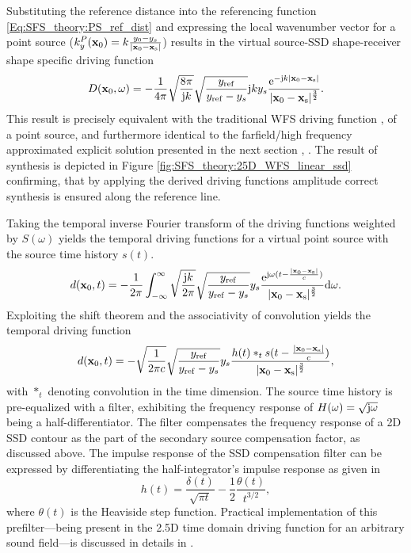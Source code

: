 Substituting the reference distance into the referencing function \eqref{Eq:SFS_theory:PS_ref_dist} and expressing the local wavenumber vector for a point source ($k_y^P(\mathbf{x}_0) = k \frac{y_0-y_s}{|\mathbf{x}_0-\mathbf{x}_{\mathrm{s}}|}$) results in the virtual source-SSD shape-receiver shape specific driving function
\begin{equation}
D(\mathbf{x}_0, \omega) =  -\frac{1}{4\pi}
\sqrt{ \frac{8\pi}{\mathrm{j} k} }
\sqrt{ \frac{y_{\mathrm{ref}}}{y_{\mathrm{ref}} -y_s } }
\mathrm{j} k y_s \frac{\mathrm{e}^{-\mathrm{j} k |\mathbf{x}_0-\mathbf{x}_{\mathrm{s}}|}}{|\mathbf{x}_0-\mathbf{x}_{\mathrm{s}}|^{\frac{3}{2}}}.
\label{eq:SFS_theory:WFS_point_source}
\end{equation}
This result is precisely equivalent with the traditional WFS driving function \cite[(2.27)]{Verheijen1997:phd}, \cite[(3.16)\&(3.17)]{Start1997:phd} of a point source, and furthermore identical to the farfield/high frequency approximated explicit solution presented in the next section \cite[(25)]{Spors10ahrens:analysis}, \cite[Ch. 2.3]{Schultz2016}. 
The result of synthesis is depicted in Figure \ref{fig:SFS_theory:25D_WFS_linear_ssd} confirming, that by applying the derived driving functions amplitude correct synthesis is ensured along the reference line.

Taking the temporal inverse Fourier transform of the driving functions weighted by $S(\omega)$ yields the temporal driving functions for a virtual point source with the source time history $s(t)$.
\begin{equation}
d(\mathbf{x}_0, t) =  -\frac{1}{2\pi} \int_{-\infty}^{\infty}
\sqrt{\frac{\mathrm{j} k}{2\pi}}
\sqrt{\frac{y_{\mathrm{ref}}}{y_{\mathrm{ref}} -y_s } } y_s \frac{\mathrm{e}^{\mathrm{j} \omega ( t - \frac{|\mathbf{x}_0-\mathbf{x}_{\mathrm{s}}|}{c} )}}{|\mathbf{x}_0-\mathbf{x}_{\mathrm{s}}|^{\frac{3}{2}}} \mathrm{d} \omega.
\end{equation}
Exploiting the shift theorem and the associativity of convolution yields the temporal driving function
\begin{equation}
d(\mathbf{x}_0, t) =  -
\sqrt{\frac{1}{2\pi c}}
\sqrt{\frac{y_{\mathrm{ref}}}{y_{\mathrm{ref}} -y_s } } y_s \frac{ h(t) \ast_t s( t - \frac{|\mathbf{x}_0-\mathbf{x}_{\mathrm{s}}|}{c} )}{|\mathbf{x}_0-\mathbf{x}_{\mathrm{s}}|^{\frac{3}{2}}},
\end{equation}
with $\ast_t$ denoting convolution in the time dimension.
The source time history is pre-equalized with a filter, exhibiting the frequency response of $H(\omega) = \sqrt{\mathrm{j} \omega}$ being a half-differentiator. 
The filter compensates the frequency response of a 2D SSD contour as the part of the secondary source compensation factor, as discussed above.
The impulse response of the SSD compensation filter can be expressed by differentiating the half-integrator's impulse response as given in \cite{Deregowski1983}
\begin{equation}
h(t) = \frac{\delta(t)}{\sqrt{\pi t}} - \frac{1}{2} \frac{\theta(t)}{t^{3/2}},
\end{equation}
where $\theta(t)$ is the Heaviside step function.
Practical implementation of this prefilter---being present in the 2.5D time domain driving function for an arbitrary sound field---is discussed in details in \cite{Schultz2013:IIR_prefilters}.
